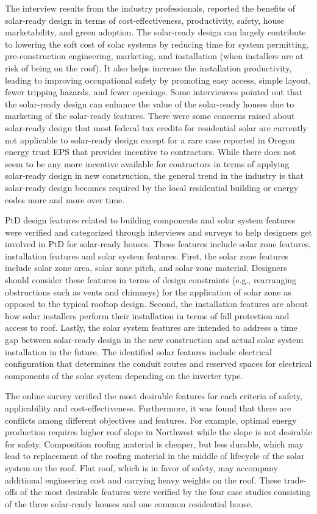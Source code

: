 \documentclass[]{article}
\begin{document}
The interview results from the industry professionals, reported the
benefits of solar-ready design in terms of cost-effectiveness,
productivity, safety, house marketability, and green adoption. The
solar-ready design can largely contribute to lowering the soft cost of
solar systems by reducing time for system permitting, pre-construction
engineering, marketing, and installation (when installers are at risk of
being on the roof). It also helps increase the installation
productivity, leading to improving occupational safety by promoting easy
access, simple layout, fewer tripping hazards, and fewer openings. Some
interviewees pointed out that the solar-ready design can enhance the
value of the solar-ready houses due to marketing of the solar-ready
features. There were some concerns raised about solar-ready design that
most federal tax credits for residential solar are currently not
applicable to solar-ready design except for a rare case reported in
Oregon energy trust EPS that provides incentive to contractors. While
there does not seem to be any more incentive available for contractors
in terms of applying solar-ready design in new construction, the general
trend in the industry is that solar-ready design becomes required by the
local residential building or energy codes more and more over time.

PtD design features related to building components and solar system
features were verified and categorized through interviews and surveys to
help designers get involved in PtD for solar-ready houses. These
features include solar zone features, installation features and solar
system features. First, the solar zone features include solar zone area,
solar zone pitch, and solar zone material. Designers should consider
these features in terms of design constraints (e.g., rearranging
obstructions such as vents and chimneys) for the application of solar
zone as opposed to the typical rooftop design. Second, the installation
features are about how solar installers perform their installation in
terms of fall protection and access to roof. Lastly, the solar system
features are intended to address a time gap between solar-ready design
in the new construction and actual solar system installation in the
future. The identified solar features include electrical configuration
that determines the conduit routes and reserved spaces for electrical
components of the solar system depending on the inverter type.

The online survey verified the most desirable features for each criteria
of safety, applicability and cost-effectiveness. Furthermore, it was
found that there are conflicts among different objectives and features.
For example, optimal energy production requires higher roof slope in
Northwest while the slope is not desirable for safety. Composition
roofing material is cheaper, but less durable, which may lead to
replacement of the roofing material in the middle of lifecycle of the
solar system on the roof. Flat roof, which is in favor of safety, may
accompany additional engineering cost and carrying heavy weights on the
roof. These trade-offs of the most desirable features were verified by
the four case studies consisting of the three solar-ready houses and one
common residential house.
\end{document}
